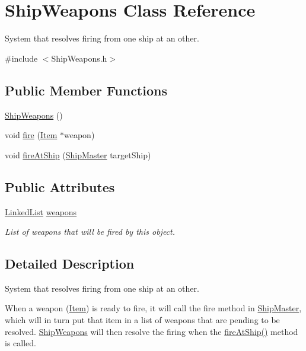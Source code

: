 \hypertarget{classShipWeapons}{\section{Ship\-Weapons Class Reference}
\label{classShipWeapons}
}


System that resolves firing from one ship at an other.  




{\ttfamily \#include $<$Ship\-Weapons.\-h$>$}

\subsection*{Public Member Functions}
\begin{DoxyCompactItemize}
\item 
\hyperlink{classShipWeapons_a3f54e78543b8a76d095ac401b338cec0}{Ship\-Weapons} ()
\item 
void \hyperlink{classShipWeapons_a34f64cad92d6bfde6f5013e6d819c016}{fire} (\hyperlink{classItem}{Item} $\ast$weapon)
\item 
void \hyperlink{classShipWeapons_a0545919bc45a47c20b240886b40253dd}{fire\-At\-Ship} (\hyperlink{classShipMaster}{Ship\-Master} target\-Ship)
\end{DoxyCompactItemize}
\subsection*{Public Attributes}
\begin{DoxyCompactItemize}
\item 
\hyperlink{classLinkedList}{Linked\-List} \hyperlink{classShipWeapons_a9a443981bc70bf02a67be7f85106ae8a}{weapons}
\begin{DoxyCompactList}\small\item\em List of weapons that will be fired by this object. \end{DoxyCompactList}\end{DoxyCompactItemize}


\subsection{Detailed Description}
System that resolves firing from one ship at an other. 

When a weapon (\hyperlink{classItem}{Item}) is ready to fire, it will call the fire method in \hyperlink{classShipMaster}{Ship\-Master}, which will in turn put that item in a list of weapons that are pending to be resolved. \hyperlink{classShipWeapons}{Ship\-Weapons} will then resolve the firing when the \hyperlink{classShipWeapons_a0545919bc45a47c20b240886b40253dd}{fire\-At\-Ship()} method is called. 

